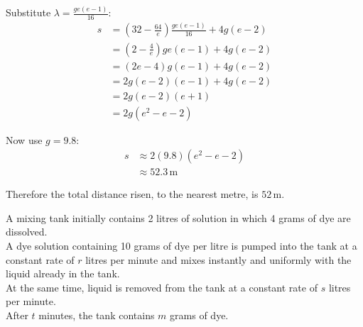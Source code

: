 \documentclass[leqno]{article}
\begin{document}
\begin{enumerate}[
  label=\textbf{\arabic*.},
  leftmargin=*,
  topsep=0pt,
  partopsep=0pt,
  parsep=0pt
]
\begin{djsSolution}
\begin{enumerate}[label=\textbf{(\alph*)}]
  Substitute $\lambda=\frac{ge(e-1)}{16}$:
  \begin{align*}
  s &= \left(32-\frac{64}{e}\right)\frac{ge(e-1)}{16}+4g(e-2) \\
  &= \left(2-\frac{4}{e}\right)ge(e-1)+4g(e-2) \\
  &= \left(2e-4\right)g(e-1)+4g(e-2) \\
  &= 2g(e-2)(e-1)+4g(e-2) \\
  &= 2g(e-2)(e+1) \\
  &= 2g(e^2-e-2)
  \end{align*}

  Now use $g=9.8$:
  \begin{align*}
  s &\approx 2(9.8)(e^2-e-2) \\
  &\approx 52.3\,\mathrm{m}
  \end{align*}

  Therefore the total distance risen, to the nearest metre, is $52\,\mathrm{m}$.
\end{enumerate}
\end{djsSolution}


\newpage

\questionitem

A mixing tank initially contains 2 litres of solution in which 4 grams of dye are dissolved. \\
A dye solution containing 10 grams of dye per litre is pumped into the tank at a constant rate of $r$ litres per minute and mixes instantly and uniformly with the liquid already in the tank. \\
At the same time, liquid is removed from the tank at a constant rate of $s$ litres per minute. \\
After $t$ minutes, the tank contains $m$ grams of dye. \\


\end{enumerate}
\end{document}
